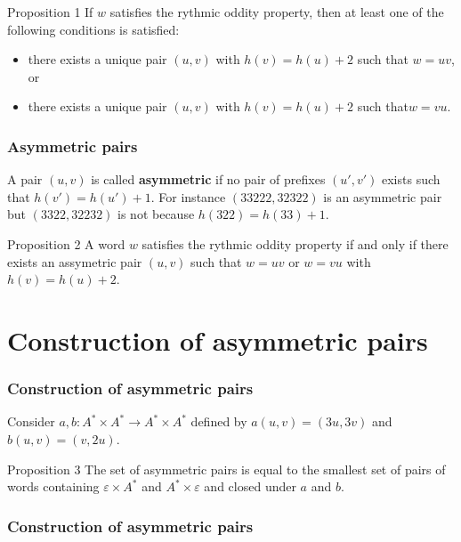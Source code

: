 \documentclass{beamer}
\theoremstyle{definition}
\newcommand{\D}{\mathbb{D}}
\begin{document}
\begin{frame}
\begin{block}{Proposition 1}
If $w$ satisfies the rythmic oddity property, then at least one of the following conditions is
satisfied:
\begin{itemize}
\item there exists a unique pair $(u,v)$ with $h(v)=h(u)+2$ such that $w=uv$, or 
\item there exists a unique pair $(u,v)$ with $h(v)=h(u)+2$ such that$w=vu$. 
\end{itemize}
\end{block}



\end{frame}
\begin{frame}
\frametitle{Asymmetric pairs}
A pair $(u,v)$ is called \textbf{asymmetric} if no pair of prefixes $(u',v')$ exists such that $h(v')=h(u')+1$. For instance $(33222,32322)$ is an asymmetric pair but $(3322,32232)$ is not because $h(322)=h(33)+1$. 

\begin{block}{Proposition 2}
A word $w$ satisfies the rythmic oddity property if and only if there exists an assymetric pair $(u,v)$ such that $w=uv$ or $w=vu$ with $h(v)=h(u)+2$. 
\end{block}
\end{frame}


\section{Construction of asymmetric pairs}

\begin{frame}
\frametitle{Construction of asymmetric pairs}
Consider $a,b:A^*\times A^*\to A^*\times A^*$ defined by $a(u,v)=(3u,3v)$ and $b(u,v)=(v,2u)$. 

\begin{block}{Proposition 3}
The set of asymmetric pairs is equal to the smallest set of pairs of words containing $\varepsilon\times A^*$ and $A^*\times\varepsilon$ and closed under $a$ and $b$. 
\end{block}
\end{frame}


\begin{frame}
\frametitle{Construction of asymmetric pairs}

\end{frame}
\begin{frame}
\end{frame}
\end{document}
